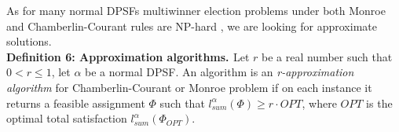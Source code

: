 As for many normal DPSFs multiwinner election problems under both Monroe and Chamberlin-Courant rules are NP-hard \cite{2,3}, we are looking for approximate solutions.
\\

\noindent
\textbf{Definition 6: Approximation algorithms. \cite{1}} \hspace{.1in} Let $r$ be a real number such that $0 < r \leq 1$, let $\alpha$ be a normal DPSF. An algorithm is an \textit{r-approximation algorithm} for Chamberlin-Courant or Monroe problem if on each instance it returns a feasible assignment $\Phi$ such that $l^{\alpha}_{sum}(\Phi) \geq r \cdot OPT$, where $OPT$ is the optimal total satisfaction $l^{\alpha}_{sum}(\Phi_{OPT})$.
\\
